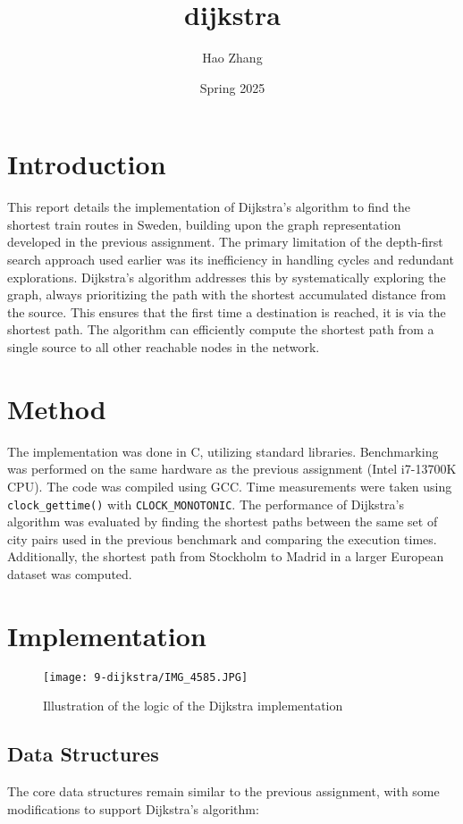 \documentclass[a4paper,11pt]{article}
\begin{document}
\title{
    \textbf{dijkstra}
}
\author{Hao Zhang}
\date{Spring 2025}

\maketitle


\section*{Introduction}
This report details the implementation of Dijkstra's algorithm to find the shortest train routes in Sweden, building upon the graph representation developed in the previous assignment. The primary limitation of the depth-first search approach used earlier was its inefficiency in handling cycles and redundant explorations. Dijkstra's algorithm addresses this by systematically exploring the graph, always prioritizing the path with the shortest accumulated distance from the source. This ensures that the first time a destination is reached, it is via the shortest path. The algorithm can efficiently compute the shortest path from a single source to all other reachable nodes in the network.

\section*{Method}
The implementation was done in C, utilizing standard libraries. Benchmarking was performed on the same hardware as the previous assignment (Intel i7-13700K CPU). The code was compiled using GCC. Time measurements were taken using \texttt{clock\_gettime()} with \texttt{CLOCK\_MONOTONIC}. The performance of Dijkstra's algorithm was evaluated by finding the shortest paths between the same set of city pairs used in the previous benchmark and comparing the execution times. Additionally, the shortest path from Stockholm to Madrid in a larger European dataset was computed.

\section*{Implementation}
\begin{figure}
    \texttt{[image: 9-dijkstra/IMG\_4585.JPG]}
    \caption{Illustration of the logic of the Dijkstra implementation}
    \label{fig:dijkstra}
\end{figure}
\subsection*{Data Structures}
The core data structures remain similar to the previous assignment, with some modifications to support Dijkstra's algorithm:
\end{document}
